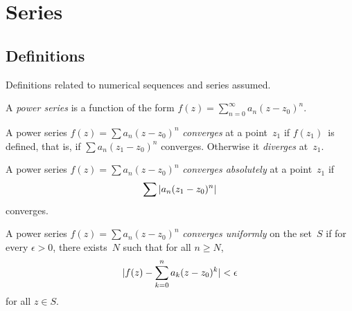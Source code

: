 %
%
%
\section{Series}
\subsection*{Definitions}
Definitions related to numerical sequences and series assumed.
\begin{defn}
A \emph{power series} is a function of the form \(f(z)=\sum_{n=0}^\infty a_n(z-z_0)^n\).
\end{defn}
\begin{defn}
A power series \(f(z)=\sum a_n(z-z_0)^n\) \emph{converges} at a point~\(z_1\) if \(f(z_1)\)~is defined, that is, if \(\sum a_n(z_1-z_0)^n\) converges. Otherwise it \emph{diverges} at~\(z_1\).
\end{defn}

\begin{defn}
A power series \(f(z)=\sum a_n(z-z_0)^n\) \emph{converges absolutely} at a point~\(z_1\) if
\[\sum|{a_n(z_1-z_0)^n}|\]
converges.
\end{defn}

\begin{defn}
A power series \(f(z)=\sum a_n(z-z_0)^n\) \emph{converges uniformly} on the set~\(S\) if for every \(\epsilon>0\), there exists~\(N\) such that for all \(n\ge N\),
\[|{f(z)-\sum_{k=0}^n a_k(z-z_0)^k}|<\epsilon\]
for all \(z\in S\).
\end{defn}

